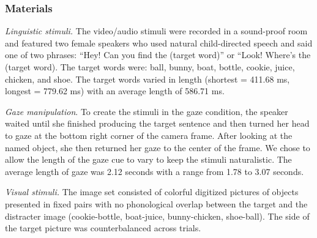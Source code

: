 \documentclass[oneside]{report}
\begin{document}
\subsubsection{Materials}\label{materials}

\emph{Linguistic stimuli.} The video/audio stimuli were recorded in a
sound-proof room and featured two female speakers who used natural
child-directed speech and said one of two phrases: ``Hey! Can you find
the (target word)'' or ``Look! Where's the (target word). The target
words were: ball, bunny, boat, bottle, cookie, juice, chicken, and shoe.
The target words varied in length (shortest = 411.68 ms, longest =
779.62 ms) with an average length of 586.71 ms.

\emph{Gaze manipulation}. To create the stimuli in the gaze condition,
the speaker waited until she finished producing the target sentence and
then turned her head to gaze at the bottom right corner of the camera
frame. After looking at the named object, she then returned her gaze to
the center of the frame. We chose to allow the length of the gaze cue to
vary to keep the stimuli naturalistic. The average length of gaze was
2.12 seconds with a range from 1.78 to 3.07 seconds.

\emph{Visual stimuli.} The image set consisted of colorful digitized
pictures of objects presented in fixed pairs with no phonological
overlap between the target and the distracter image (cookie-bottle,
boat-juice, bunny-chicken, shoe-ball). The side of the target picture
was counterbalanced across trials.
\end{document}
